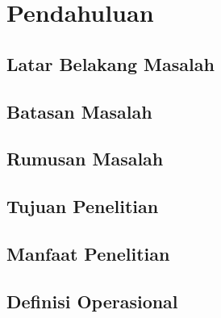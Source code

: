 \chapter{Pendahuluan}
\section{Latar Belakang Masalah}
\section{Batasan Masalah}
\section{Rumusan Masalah}
\section{Tujuan Penelitian}
\section{Manfaat Penelitian}
\section{Definisi Operasional}
